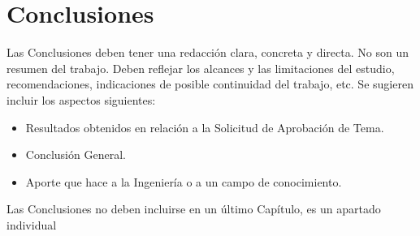 \chapter{Conclusiones }

Las Conclusiones deben tener una redacción clara, concreta y directa. No son un resumen del trabajo.
Deben reflejar los alcances y las limitaciones del estudio, recomendaciones, indicaciones de posible continuidad del trabajo, etc.
Se sugieren incluir los aspectos siguientes:

\begin{itemize}
    \item Resultados obtenidos en relación a la Solicitud de Aprobación de Tema.
    \item Conclusión General.
    \item Aporte que hace a la Ingeniería o a un campo de conocimiento. 
\end{itemize}

Las Conclusiones no deben incluirse en un último Capítulo, es un apartado individual